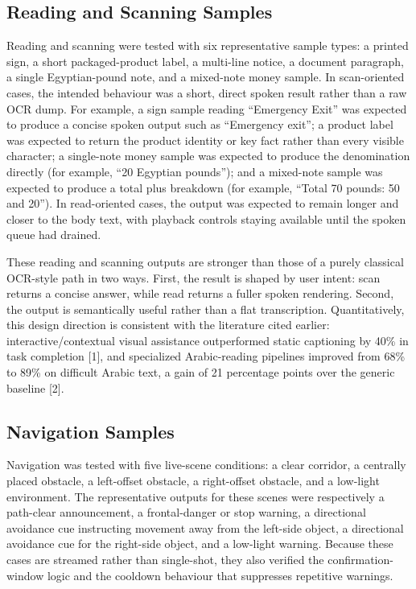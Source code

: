 \documentclass[a4paper]{report}
\begin{document}
\subsection{Reading and Scanning Samples}
Reading and scanning were tested with six representative sample types: a printed sign, a short packaged-product label, a multi-line notice, a document paragraph, a single Egyptian-pound note, and a mixed-note money sample. In scan-oriented cases, the intended behaviour was a short, direct spoken result rather than a raw OCR dump. For example, a sign sample reading ``Emergency Exit'' was expected to produce a concise spoken output such as ``Emergency exit''; a product label was expected to return the product identity or key fact rather than every visible character; a single-note money sample was expected to produce the denomination directly (for example, ``20 Egyptian pounds''); and a mixed-note sample was expected to produce a total plus breakdown (for example, ``Total 70 pounds: 50 and 20''). In read-oriented cases, the output was expected to remain longer and closer to the body text, with playback controls staying available until the spoken queue had drained.

These reading and scanning outputs are stronger than those of a purely classical OCR-style path in two ways. First, the result is shaped by user intent: scan returns a concise answer, while read returns a fuller spoken rendering. Second, the output is semantically useful rather than a flat transcription. Quantitatively, this design direction is consistent with the literature cited earlier: interactive/contextual visual assistance outperformed static captioning by 40\% in task completion [1], and specialized Arabic-reading pipelines improved from 68\% to 89\% on difficult Arabic text, a gain of 21 percentage points over the generic baseline [2].

\subsection{Navigation Samples}
Navigation was tested with five live-scene conditions: a clear corridor, a centrally placed obstacle, a left-offset obstacle, a right-offset obstacle, and a low-light environment. The representative outputs for these scenes were respectively a path-clear announcement, a frontal-danger or stop warning, a directional avoidance cue instructing movement away from the left-side object, a directional avoidance cue for the right-side object, and a low-light warning. Because these cases are streamed rather than single-shot, they also verified the confirmation-window logic and the cooldown behaviour that suppresses repetitive warnings.
\end{document}
